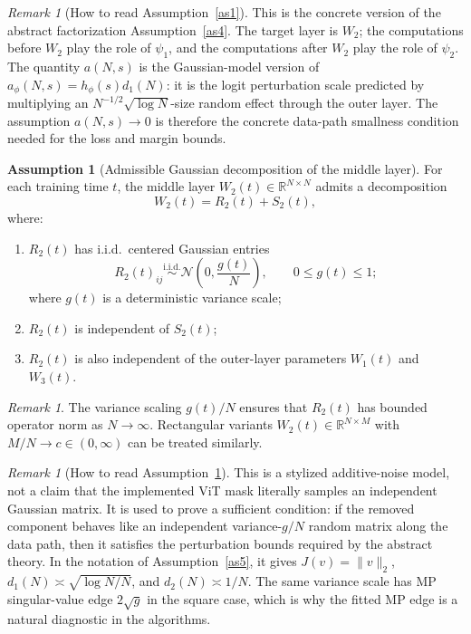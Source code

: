 \documentclass[11pt]{article}
\theoremstyle{plain}
\theoremstyle{definition}
\newtheorem{assumption}[thm]{Assumption}
\theoremstyle{remark}
\newtheorem{rem}[thm]{Remark}
\newcommand{\R}{\mathbb{R}}
\newcommand{\1}{\mathbf{1}}
\begin{document}
\begin{rem}[How to read Assumption~\ref{as1}]
This is the concrete version of the abstract factorization Assumption~\ref{as4}.  The target layer is \(W_2\); the computations before \(W_2\) play the role of \(\psi_1\), and the computations after \(W_2\) play the role of \(\psi_2\).  The quantity \(a(N,s)\) is the Gaussian-model version of \(a_\phi(N,s)=h_\phi(s)d_1(N)\): it is the logit perturbation scale predicted by multiplying an \(N^{-1/2}\sqrt{\log N}\)-size random effect through the outer layer.  The assumption \(a(N,s)\to0\) is therefore the concrete data-path smallness condition needed for the loss and margin bounds.
\end{rem}

\begin{assumption}[Admissible Gaussian decomposition of the middle layer]
\label{as2}
For each training time \(t\), the middle layer \(W_2(t)\in\R^{N\times N}\) admits a decomposition
\[
W_2(t)=R_2(t)+S_2(t),
\]
where:
\begin{enumerate}[leftmargin=2em]
\item \(R_2(t)\) has i.i.d.\ centered Gaussian entries
\[
R_2(t)_{ij}\overset{\mathrm{i.i.d.}}{\sim}\mathcal N\!\left(0,\frac{g(t)}{N}\right),
\qquad 0\le g(t)\le 1;
\]
where \(g(t)\) is a deterministic variance scale;
\item \(R_2(t)\) is independent of \(S_2(t)\);
\item \(R_2(t)\) is also independent of the outer-layer parameters \(W_1(t)\) and \(W_3(t)\).
\end{enumerate}
\end{assumption}

\begin{rem}
The variance scaling \(g(t)/N\) ensures that \(R_2(t)\) has bounded operator norm as \(N\to\infty\). Rectangular variants \(W_2(t)\in\R^{N\times M}\) with \(M/N\to c\in(0,\infty)\) can be treated similarly.
\end{rem}

\begin{rem}[How to read Assumption~\ref{as2}]
This is a stylized additive-noise model, not a claim that the implemented ViT mask literally samples an independent Gaussian matrix.  It is used to prove a sufficient condition: if the removed component behaves like an independent variance-\(g/N\) random matrix along the data path, then it satisfies the perturbation bounds required by the abstract theory.  In the notation of Assumption~\ref{as5}, it gives \(J(v)=\|v\|_2\), \(d_1(N)\asymp\sqrt{\log N/N}\), and \(d_2(N)\asymp1/N\).  The same variance scale has MP singular-value edge \(2\sqrt g\) in the square case, which is why the fitted MP edge is a natural diagnostic in the algorithms.
\end{rem}
\end{document}
